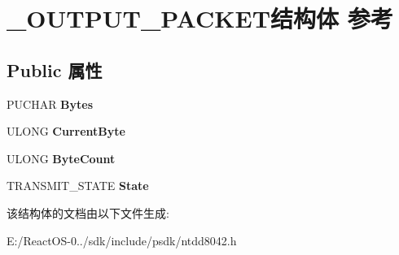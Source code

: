 \hypertarget{struct___o_u_t_p_u_t___p_a_c_k_e_t}{}\section{\+\_\+\+O\+U\+T\+P\+U\+T\+\_\+\+P\+A\+C\+K\+E\+T结构体 参考}
\label{struct___o_u_t_p_u_t___p_a_c_k_e_t}
\subsection*{Public 属性}
\begin{DoxyCompactItemize}
\item 
\mbox{\label{struct___o_u_t_p_u_t___p_a_c_k_e_t_ad6e13c2c8e13a682b6c400157d505b68}} 
P\+U\+C\+H\+AR {\bfseries Bytes}
\item 
\mbox{\label{struct___o_u_t_p_u_t___p_a_c_k_e_t_a3f63f9d695dbe673265d5272d2e73c4c}} 
U\+L\+O\+NG {\bfseries Current\+Byte}
\item 
\mbox{\label{struct___o_u_t_p_u_t___p_a_c_k_e_t_a19402361605b2df3372dc4a931c0475b}} 
U\+L\+O\+NG {\bfseries Byte\+Count}
\item 
\mbox{\label{struct___o_u_t_p_u_t___p_a_c_k_e_t_acbc04ea77229a29c57c02e219fb60b2d}} 
T\+R\+A\+N\+S\+M\+I\+T\+\_\+\+S\+T\+A\+TE {\bfseries State}
\end{DoxyCompactItemize}


该结构体的文档由以下文件生成\+:\begin{DoxyCompactItemize}
\item 
E\+:/\+React\+O\+S-\/0../sdk/include/psdk/ntdd8042.\+h\end{DoxyCompactItemize}
